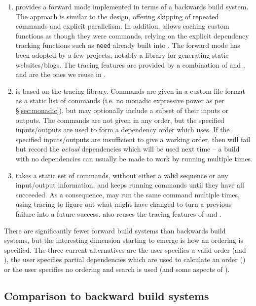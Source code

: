 \begin{enumerate}
\item \Shake \cite{shake} provides a forward mode implemented in terms of a backwards build system. The approach is similar to the \Fabricate design, offering skipping of repeated commands and explicit parallelism. In addition, \Shake allows caching custom functions as though they were commands, relying on the explicit dependency tracking functions such as \texttt{need} already built into \Shake. The forward mode has been adopted by a few projects, notably a library for generating static websites/blogs. The tracing features are provided by a combination of \Shake and \Fsatrace, and are the ones we reuse in \Rattle.
\item \Fac \cite{fac} is based on the \Bigbro tracing library. Commands are given in a custom file format as a static list of commands (i.e. no monadic expressive power as per \S\ref{sec:monadic}), but may optionally include a subset of their inputs or outputs. The commands are not given in any order, but the specified inputs/outputs are used to form a dependency order which \Fac uses. If the specified inputs/outputs are insufficient to give a working order, then \Fac will fail but record the \emph{actual} dependencies which will be used next time -- a build with no dependencies can usually be made to work by running \Fac multiple times.
\item \Stroll \cite{stroll} takes a static set of commands, without either a valid sequence or any input/output information, and keeps running commands until they have all succeeded. As a consequence, \Stroll may run the same command multiple times, using tracing to figure out what might have changed to turn a previous failure into a future success. \Stroll also reuses the tracing features of \Shake and \Fsatrace.
\end{enumerate}

There are significantly fewer forward build systems than backwards build systems, but the interesting dimension starting to emerge is how an ordering is specified. The three current alternatives are the user specifies a valid order (\Fabricate and \Rattle), the user specifies partial dependencies which are used to calculate an order (\Fac) or the user specifies no ordering and search is used (\Stroll and some aspects of \Fac).

\subsection{Comparison to backward build systems}
\label{sec:remote_execution}

